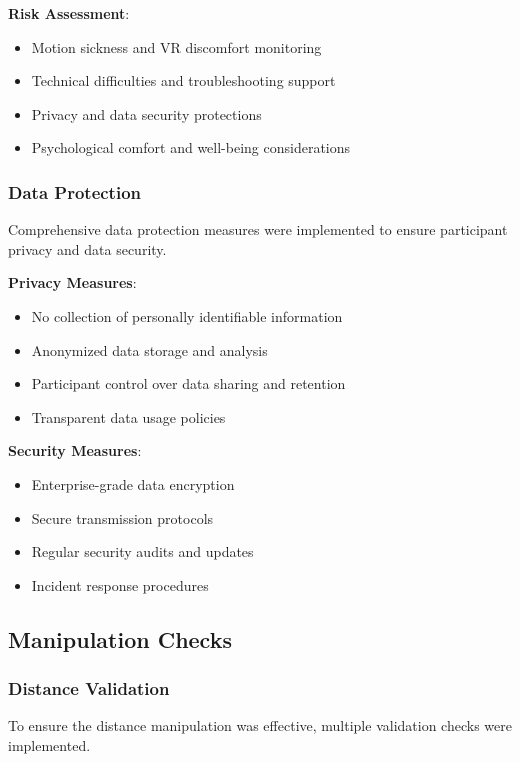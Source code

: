 \documentclass[12pt]{article}
\begin{document}
\textbf{Risk Assessment}:
\begin{itemize}
    \item Motion sickness and VR discomfort monitoring
    \item Technical difficulties and troubleshooting support
    \item Privacy and data security protections
    \item Psychological comfort and well-being considerations
\end{itemize}

\subsubsection{Data Protection}

Comprehensive data protection measures were implemented to ensure participant privacy and data security.

\textbf{Privacy Measures}:
\begin{itemize}
    \item No collection of personally identifiable information
    \item Anonymized data storage and analysis
    \item Participant control over data sharing and retention
    \item Transparent data usage policies
\end{itemize}

\textbf{Security Measures}:
\begin{itemize}
    \item Enterprise-grade data encryption
    \item Secure transmission protocols
    \item Regular security audits and updates
    \item Incident response procedures
\end{itemize}

\subsection{Manipulation Checks}

\subsubsection{Distance Validation}

To ensure the distance manipulation was effective, multiple validation checks were implemented.
\end{document}
